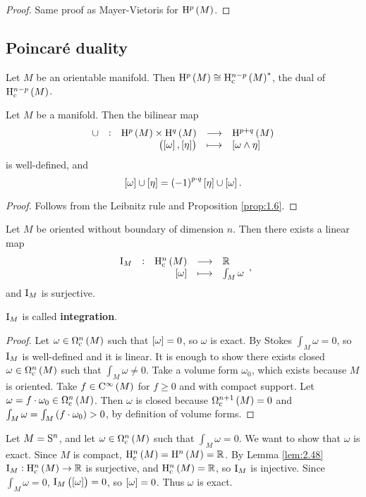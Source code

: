 \begin{proof}
Same proof as Mayer-Vietoris for $ \H^p\br{M} $.
\end{proof}

\subsection{Poincar\'e duality}

Let $ M $ be an orientable manifold. Then $ \H^p\br{M} \cong \H_\c^{n - p}\br{M}^* $, the dual of $ \H_\c^{n - p}\br{M} $.

\begin{proposition}
Let $ M $ be a manifold. Then the bilinear map
$$ \function[\cup]{\H^p\br{M} \times \H^q\br{M}}{\H^{p + q}\br{M}}{\br{\sbr{\omega}, \sbr{\eta}}}{\sbr{\omega \wedge \eta}} $$
is well-defined, and
$$ \sbr{\omega} \cup \sbr{\eta} = \br{-1}^{p \cdot q}\sbr{\eta} \cup \sbr{\omega}. $$
\end{proposition}

\begin{proof}
Follows from the Leibnitz rule and Proposition \ref{prop:1.6}.
\end{proof}

\pagebreak

\begin{lemma}
\label{lem:2.48}
Let $ M $ be oriented without boundary of dimension $ n $. Then there exists a linear map
$$ \function[\I_M]{\H_\c^n\br{M}}{\RR}{\sbr{\omega}}{\int_M \omega}, $$
and $ \I_M $ is surjective.
\end{lemma}

$ \I_M $ is called \textbf{integration}.

\begin{proof}
Let $ \omega \in \Omega_\c^n\br{M} $ such that $ \sbr{\omega} = 0 $, so $ \omega $ is exact. By Stokes $ \int_M \omega = 0 $, so $ \I_M $ is well-defined and it is linear. It is enough to show there exists closed $ \omega \in \Omega_\c^n\br{M} $ such that $ \int_M \omega \ne 0 $. Take a volume form $ \omega_0 $, which exists because $ M $ is oriented. Take $ f \in \C^\infty\br{M} $ for $ f \ge 0 $ and with compact support. Let $ \omega = f \cdot \omega_0 \in \Omega_\c^n\br{M} $. Then $ \omega $ is closed because $ \Omega_\c^{n + 1}\br{M} = 0 $ and $ \int_M \omega = \int_M \br{f \cdot \omega_0} > 0 $, by definition of volume forms.
\end{proof}

\begin{example}
Let $ M = \S^n $, and let $ \omega \in \Omega_\c^n\br{M} $ such that $ \int_M \omega = 0 $. We want to show that $ \omega $ is exact. Since $ M $ is compact, $ \H_\c^n\br{M} = \H^n\br{M} = \RR $. By Lemma \ref{lem:2.48} $ \I_M : \H_\c^n\br{M} \to \RR $ is surjective, and $ \H_\c^n\br{M} = \RR $, so $ \I_M $ is injective. Since $ \int_M \omega = 0 $, $ \I_M\br{\sbr{\omega}} = 0 $, so $ \sbr{\omega} = 0 $. Thus $ \omega $ is exact.
\end{example}

